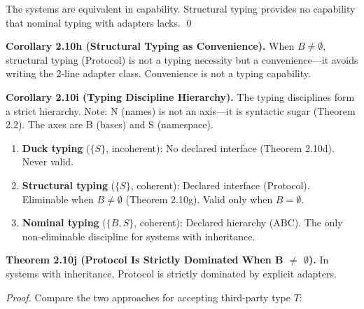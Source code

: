 The systems are equivalent in capability. Structural typing provides no
capability that nominal typing with adapters lacks. \qed

\textbf{Corollary 2.10h (Structural Typing as Convenience).} When
\(B \neq \emptyset\), structural typing (Protocol) is not a typing
necessity but a convenience---it avoids writing the 2-line adapter
class. Convenience is not a typing capability.

\textbf{Corollary 2.10i (Typing Discipline Hierarchy).} The typing
disciplines form a strict hierarchy. Note: N (names) is not an axis---it is syntactic sugar (Theorem 2.2). The axes are B (bases) and S (namespace).

\begin{enumerate}
\def\labelenumi{\arabic{enumi}.}
\tightlist
\item
  \textbf{Duck typing} (\(\{S\}\), incoherent): No declared interface (Theorem 2.10d).
  Never valid.
\item
  \textbf{Structural typing} (\(\{S\}\), coherent): Declared interface (Protocol).
  Eliminable when \(B \neq \emptyset\) (Theorem 2.10g). Valid only when
  \(B = \emptyset\).
\item
  \textbf{Nominal typing} (\(\{B, S\}\), coherent): Declared hierarchy (ABC).
  The only non-eliminable discipline for systems with inheritance.
\end{enumerate}

\textbf{Theorem 2.10j (Protocol Is Strictly Dominated When B $\neq$ $\emptyset$).}\label{thm:protocol-strictly-dominated}
In
systems with inheritance, Protocol is strictly dominated by explicit
adapters.

\emph{Proof.} Compare the two approaches for accepting third-party type
\(T\):

